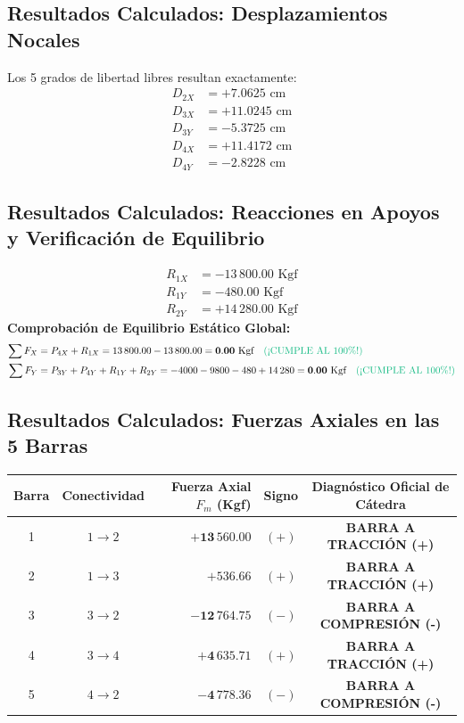 \documentclass[10pt,a4paper]{article}
\begin{document}
\subsection{Resultados Calculados: Desplazamientos Nocales}
Los 5 grados de libertad libres resultan exactamente:
\[
\begin{aligned}
D_{2X} &= +7.0625\text{ cm} \\
D_{3X} &= +11.0245\text{ cm} \\
D_{3Y} &= -5.3725\text{ cm} \\
D_{4X} &= +11.4172\text{ cm} \\
D_{4Y} &= -2.8228\text{ cm}
\end{aligned}
\]

\subsection{Resultados Calculados: Reacciones en Apoyos y Verificación de Equilibrio}
\[
\begin{aligned}
R_{1X} &= -13\,800.00\text{ Kgf} \\
R_{1Y} &= -480.00\text{ Kgf} \\
R_{2Y} &= +14\,280.00\text{ Kgf}
\end{aligned}
\]
\textbf{Comprobación de Equilibrio Estático Global:}
\begin{align*}
\sum F_X &= P_{4X} + R_{1X} = 13\,800.00 - 13\,800.00 = \mathbf{0.00\text{ Kgf}} \quad \text{\color{profGreen}(¡CUMPLE AL 100\%!)} \\
\sum F_Y &= P_{3Y} + P_{4Y} + R_{1Y} + R_{2Y} = -4000 - 9800 - 480 + 14\,280 = \mathbf{0.00\text{ Kgf}} \quad \text{\color{profGreen}(¡CUMPLE AL 100\%!)}
\end{align*}

\subsection{Resultados Calculados: Fuerzas Axiales en las 5 Barras}
\begin{center}
\small
\begin{tabular}{|c|c|r|c|c|}
\hline
\rowcolor{pastelYellow}
\textbf{Barra} & \textbf{Conectividad} & \textbf{Fuerza Axial $F_m$ (Kgf)} & \textbf{Signo} & \textbf{Diagnóstico Oficial de Cátedra} \\
\hline
1 & $1 \to 2$ & $\mathbf{+13\,560.00}$ & $(+)$ & \textbf{\color{profBlue}BARRA A TRACCIÓN (+)} \\
2 & $1 \to 3$ & $\mathbf{+536.66}$ & $(+)$ & \textbf{\color{profBlue}BARRA A TRACCIÓN (+)} \\
3 & $3 \to 2$ & $\mathbf{-12\,764.75}$ & $(-)$ & \textbf{\color{roseComp}BARRA A COMPRESIÓN (-)} \\
4 & $3 \to 4$ & $\mathbf{+4\,635.71}$ & $(+)$ & \textbf{\color{profBlue}BARRA A TRACCIÓN (+)} \\
5 & $4 \to 2$ & $\mathbf{-4\,778.36}$ & $(-)$ & \textbf{\color{roseComp}BARRA A COMPRESIÓN (-)} \\
\hline
\end{tabular}
\end{center}
\end{document}
